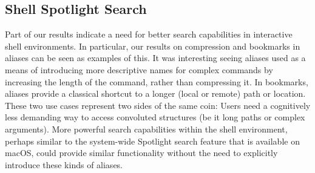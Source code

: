 \subsection{Shell Spotlight Search}

Part of our results indicate a need for better search capabilities in interactive shell environments.
In particular, our results on compression and bookmarks in aliases can be seen as examples of this. 
It was interesting seeing aliases used as a means of introducing more descriptive names for complex commands by increasing the length of the command, rather than compressing it.
In bookmarks, aliases provide a classical shortcut to a longer (local or remote) path or location.
These two use cases represent two sides of the same coin: Users need a cognitively less demanding way to access convoluted structures (be it long paths or complex arguments).
More powerful search capabilities within the shell environment, perhaps similar to the system-wide Spotlight search feature that is available on macOS, could provide similar functionality without the need to explicitly introduce these kinds of aliases.





